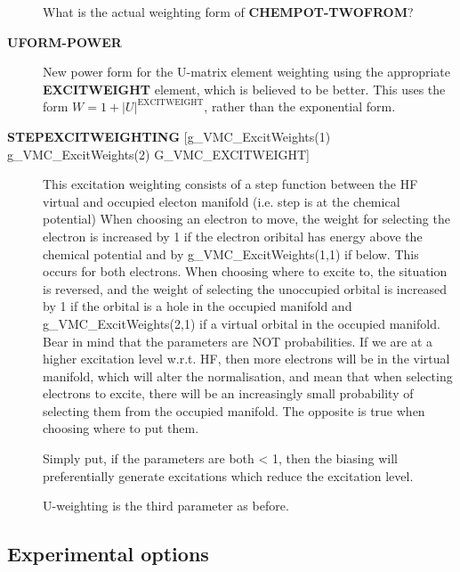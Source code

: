 \documentclass[openany,a4paper,10pt]{manual}
\begin{document}
\begin{description}
\begin{notice}[note]
What is the actual weighting form of \textbf{CHEMPOT-TWOFROM}?
\end{notice}

\item[\textbf{UFORM-POWER}]
New power form for the U-matrix element weighting using the
appropriate \textbf{EXCITWEIGHT} element, which is believed to be
better. This uses the form $W=1+|U|^{\text{EXCITWEIGHT}}$, rather than the
exponential form.

\item[\textbf{STEPEXCITWEIGHTING} {[}g\_VMC\_ExcitWeights(1) g\_VMC\_ExcitWeights(2) G\_VMC\_EXCITWEIGHT{]}]
This excitation weighting consists of a step function between the HF virtual and occupied electon manifold (i.e. step is at the chemical potential)
When choosing an electron to move, the weight for selecting the electron is increased by 1 if the electron oribital has energy above the chemical potential
and by g\_VMC\_ExcitWeights(1,1) if below. This occurs for both electrons. When choosing where to excite to, the situation is reversed, and the weight of selecting the
unoccupied orbital is increased by 1 if the orbital is a hole in the occupied manifold and g\_VMC\_ExcitWeights(2,1) if a virtual orbital in the occupied manifold.
Bear in mind that the parameters are NOT probabilities. If we are at a higher excitation level w.r.t. HF, then more electrons will be in the virtual manifold,
which will alter the normalisation, and mean that when selecting electrons to excite, there will be an increasingly small probability of selecting them from the
occupied manifold. The opposite is true when choosing where to put them.

Simply put, if the parameters are both \textless{} 1, then the biasing will preferentially generate excitations which reduce the excitation level.

U-weighting is the third parameter as before.

\end{description}


\subsection{Experimental options}
\end{document}
